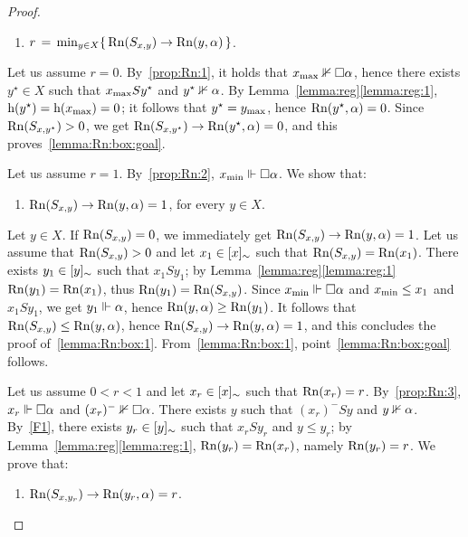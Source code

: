 \begin{proof}
 \begin{enumerate}[label=(\arabic*), ref=(\arabic*),leftmargin=*]
\item\label{lemma:Rn:box:goal}
  $r\,= \,\min_{y\in X}\{\,\mathrm{Rn}(S_{x,y})\to \mathrm{Rn}(y,\alpha) \,\}$.
\end{enumerate}

\noindent 
Let us assume $r=0$. By~\ref{prop:Rn:1}, it holds that $x_{\mathrm{max}} \nVdash  \Box \alpha$, hence
there exists $y^\star\in X$ such that $x_{\mathrm{max}} S y^\star$ and $y^\star\nVdash \alpha$.
By Lemma~\ref{lemma:reg}\ref{lemma:reg:1}, $\mathrm{h}(y^\star)=\mathrm{h}(x_{\mathrm{max}})=0$;
it follows that  $y^\star=y_{\mathrm{max}}$, hence
$\mathrm{Rn}(y^\star,\alpha)=0$.
Since $\mathrm{Rn}(S_{x,y^\star}) > 0$,
we get  $\mathrm{Rn}(S_{x,y^\star})\to \mathrm{Rn}(y^\star,\alpha)=0$, and this proves~\ref{lemma:Rn:box:goal}.

Let us assume $r=1$. By~\ref{prop:Rn:2},  $x_{\mathrm{min}}\Vdash \Box \alpha$.
We show that:


 \begin{enumerate}[label=(\alph*), ref=(\alph*),leftmargin=*]
\item\label{lemma:Rn:box:1}
$\mathrm{Rn}(S_{x,y})\to \mathrm{Rn}(y,\alpha)=1$, for every $y\in X$.
\end{enumerate}
Let $y\in X$.
If $\mathrm{Rn}(S_{x,y})=0$, we immediately get $\mathrm{Rn}(S_{x,y})\to \mathrm{Rn}(y,\alpha)=1$.
Let us assume that   $\mathrm{Rn}(S_{x,y}) > 0$ and let $x_1\in [x]_\sim$
such that $\mathrm{Rn}(S_{x,y})=\mathrm{Rn}(x_1)$.  There exists
$y_1\in [y]_\sim$ such that $ x_1 S y_1$;  by Lemma~\ref{lemma:reg}\ref{lemma:reg:1} $\mathrm{Rn}(y_1) = \mathrm{Rn}(x_1)$,
thus  $\mathrm{Rn}(y_1) = \mathrm{Rn}(S_{x,y})$.
Since  $x_{\mathrm{min}}\Vdash \Box \alpha$ and $x_{\mathrm{min}}\leq x_1$ and $x_1 S y_1$, we get $y_1\Vdash \alpha$, hence $\mathrm{Rn}(y,\alpha)\geq \mathrm{Rn}(y_1)$.
It follows that  $\mathrm{Rn}(S_{x,y})\leq\mathrm{Rn}(y,\alpha)$,
hence  $\mathrm{Rn}(S_{x,y})\to \mathrm{Rn}(y,\alpha)=1$, and
this concludes the  proof of~\ref{lemma:Rn:box:1}.
From~\ref{lemma:Rn:box:1}, point~\ref{lemma:Rn:box:goal} follows.


Let us assume $0 < r < 1$ and let  $x_r\in  [x]_\sim$ such that  $\mathrm{Rn}(x_r)=r$.
By~\ref{prop:Rn:3},    $x_r\Vdash \Box \alpha$  and   $(x_r)^-\nVdash \Box \alpha$. 
There exists $y$ such that $ (x_r)^- S y$ and  $y\nVdash \alpha$.
By~\ref{F1}, there exists $y_r\in[y]_\sim$  such that  $x_r S y_r$
and $y \leq y_r$; by Lemma~\ref{lemma:reg}\ref{lemma:reg:1},
$\mathrm{Rn}(y_r) = \mathrm{Rn}(x_r)$, namely
$\mathrm{Rn}(y_r) = r$.
We prove that:
\begin{enumerate}[label=(\alph*), ref=(\alph*),leftmargin=*,start=2]
\item\label{lemma:Rn:box:2}
$\mathrm{Rn}(S_{x,{y_r}})\to \mathrm{Rn}(y_r,\alpha)= r$.
\end{enumerate}



\end{proof}

